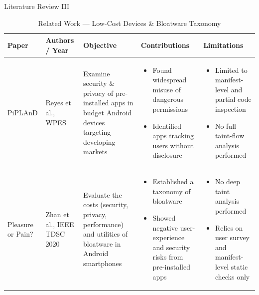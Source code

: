 \documentclass[aspectratio=169]{beamer}
\begin{document}
\begin{frame}{Literature Review III}
\begin{table}[ht]
    \centering
    \caption{Related Work — Low-Cost Devices \& Bloatware Taxonomy}
    \tiny
    \begin{tabular}{|p{0.6in}|p{0.65in}|p{1.0in}|p{1.3in}|p{1.3in}|}
    \hline
    \textbf{Paper} & \textbf{Authors / Year} & \textbf{Objective} &
    \textbf{Contributions} & \textbf{Limitations} \\
    \hline
    \vspace{1mm}
    PiPLAnD &
    Reyes et al., WPES &
    Examine security \& privacy of pre-installed apps in budget Android devices targeting developing markets &
    \begin{itemize}
        \item Found widespread misuse of dangerous permissions
        \item Identified apps tracking users without disclosure
    \end{itemize} &
    \begin{itemize}
        \item Limited to manifest-level and partial code inspection
        \item No full taint-flow analysis performed
    \end{itemize} \\
    \hline
    \vspace{1mm}
    Pleasure or Pain? &
    Zhan et al., IEEE TDSC 2020 &
    Evaluate the costs (security, privacy, performance) and utilities of bloatware in Android smartphones &
    \begin{itemize}
        \item Established a taxonomy of bloatware
        \item Showed negative user-experience and security risks from pre-installed apps
    \end{itemize} &
    \begin{itemize}
        \item No deep taint analysis performed
        \item Relies on user survey and manifest-level static checks only
    \end{itemize} \\
    \hline
    \end{tabular}
\end{table}
\end{frame}
\end{document}

